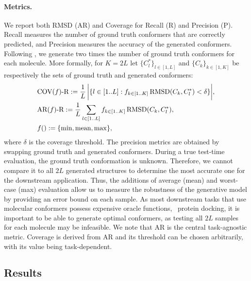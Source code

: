 \paragraph{Metrics.} We report both RMSD (AR) and Coverage for Recall (R) and Precision (P). Recall measures the number of ground truth conformers that are correctly predicted, and Precision measures the accuracy of the generated conformers.
Following \citet{torsional-diffusion}, we generate two times the number of ground truth conformers for each molecule. More formally, for $K=2L$ let $\{C^*_l\}_{l \in [1, L]}$ and $\{C_k\}_{k \in [1, K]}$ be respectively the sets of ground truth and generated conformers:
\begin{equation}
\begin{aligned}
&\text{COV($f$)-R} := \frac{1}{L}\, \bigg\lvert\{ l \in [1..L]: f_{ k\in [1..K]} \operatorname{RMSD}(C_k, C^*_l) < \delta \} \bigg\rvert,\\
&\text{AR($f$)-R} := \frac{1}{L} \sum_{l \in [1..L]}  f_{ k\in [1..K]} \operatorname{RMSD}(C_k, C^*_l),\\
&\text{$f()$} := \{{\min, \operatorname{mean}, \max}\},
\end{aligned}
\end{equation}
where $\delta$ is the coverage threshold. The precision metrics are obtained by swapping ground truth and generated conformers. 
During a true test-time evaluation, the ground truth conformation is unknown. Therefore, we cannot compare it to all $2L$ generated structures to determine the most accurate one for the downstream application.
Thus, the additions of average (mean) and worst-case (max) evaluation allow us to measure the robustness of the generative model by providing an error bound on each sample. 
As most downstream tasks that use molecular conformers possess expensive oracle functions, \ie\ protein docking, it is important to be able to generate optimal conformers, as testing all $2L$ samples for each molecule may be infeasible.
We note that AR is the central task-agnostic metric. Coverage is derived from AR and its threshold can be chosen arbitrarily, with its value being task-dependent.

\vspace{-2ex}
\subsection{Results}
\label{section:results}
\vspace{-1ex}


